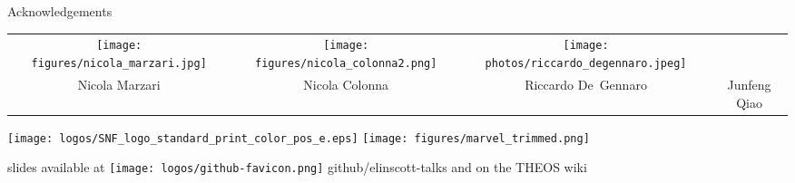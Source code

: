 \documentclass[xcolor=table,aspectratio=169]{beamer}
\numberwithin{equation}{section}
\newcommand{\insertframeinfo}{\insertframenumber}
\newcommand{\backupbegin}{
   \newcounter{finalframe}
   \setcounter{finalframe}{\value{framenumber}}
   \renewcommand{\insertframeinfo}{}
}
\newcommand{\backupend}{
   \setcounter{framenumber}{\value{finalframe}}
}
\begin{document}
\begingroup
{}
\begin{frame}{Acknowledgements}
   \begin{center}
      \footnotesize
      \begin{tabularx}{\textwidth}{CCCC}
         \texttt{[image: figures/nicola\_marzari.jpg]}  &
         \texttt{[image: figures/nicola\_colonna2.png]} &
         \texttt{[image: photos/riccardo\_degennaro.jpeg]} \\
         Nicola Marzari                                                          &
         Nicola Colonna                                                          &
         Riccardo De~Gennaro                                                     &
         Junfeng Qiao
      \end{tabularx}
   \end{center}

   \vspace{2ex}

   \begin{center}
      \texttt{[image: logos/SNF\_logo\_standard\_print\_color\_pos\_e.eps]}
      \hspace{3em}
      \texttt{[image: figures/marvel\_trimmed.png]}
   \end{center}

   \vspace{1ex}

   \begin{center}
      slides available at \texttt{[image: logos/github-favicon.png]} github/elinscott-talks and on the THEOS wiki
   \end{center}

   \vspace{2ex}
   \scriptsize


   \vspace{2ex}
   \scriptsize
\end{frame}
\endgroup
% 
% 
% 
% 
% 
\end{document}
